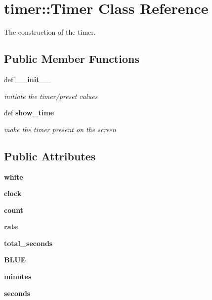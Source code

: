 \section{timer::Timer Class Reference}
\label{classtimer_1_1Timer}
The construction of the timer.  


\subsection*{Public Member Functions}
\begin{CompactItemize}
\item 
def \bf{\_\-\_\-init\_\-\_\-}
\begin{CompactList}\small\item\em initiate the timer/preset values \item\end{CompactList}\item 
def \bf{show\_\-time}
\begin{CompactList}\small\item\em make the timer present on the screen \item\end{CompactList}\end{CompactItemize}
\subsection*{Public Attributes}
\begin{CompactItemize}
\item 
\textbf{white}\label{classtimer_1_1Timer_7c32204987805757107075202b69ee1b}

\item 
\textbf{clock}\label{classtimer_1_1Timer_6e8577e625ab1afac84fe363e3312230}

\item 
\textbf{count}\label{classtimer_1_1Timer_46256e20059c8e1f661286941773324f}

\item 
\textbf{rate}\label{classtimer_1_1Timer_0feb81b015b32650db5907aba610fda2}

\item 
\textbf{total\_\-seconds}\label{classtimer_1_1Timer_2e01dd70cce7a33418771a904fe38d72}

\item 
\textbf{BLUE}\label{classtimer_1_1Timer_932737b74556ee4197948104b0abb189}

\item 
\textbf{minutes}\label{classtimer_1_1Timer_a8959d95cbebcecd9402909ca9ec4b50}

\item 
\textbf{seconds}\label{classtimer_1_1Timer_becb67e0365e7807f41b6455217fd5c3}

\end{CompactItemize}


